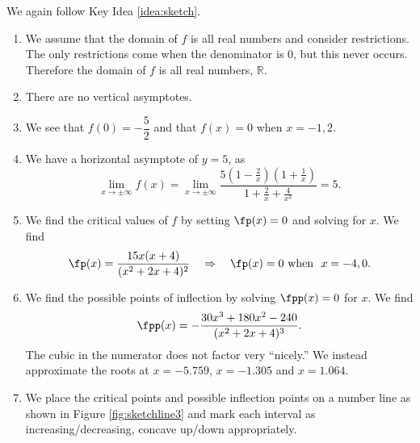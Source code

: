 
{We again follow Key Idea \ref{idea:sketch}.
	\begin{enumerate}
	\item		We assume that the domain of $f$ is all real numbers and consider restrictions. The only restrictions come when the denominator is 0, but this never occurs. Therefore the domain of $f$ is all real numbers, $\mathbb{R}$.
	\item		There are no vertical asymptotes.
	\item		We see that $f(0)=-\dfrac52$ and that $f(x)=0$ when $x=-1,2$.
	\item		We have a horizontal asymptote of $y=5$, as
	\[\lim_{x\to\pm\infty}f(x)=\lim_{x\to\pm\infty}\frac{5(1-\frac2x)(1+\frac1x)}{1+\frac2x+\frac4{x^2}}=5.\]
	\item		We find the critical values of $f$ by setting $\fp(x)=0$ and solving for $x$. We find 
				$$\fp(x) = \frac{15x(x+4)}{(x^2+2x+4)^2} \quad \Rightarrow \quad \fp(x) = 0 \text{ when } \ x=-4,0.$$
	\item		We find the possible points of inflection by solving $\fpp(x) = 0$ for $x$. We find
			$$\fpp(x) = -\frac{30x^3+180x^2-240}{(x^2+2x+4)^3}.$$ The cubic in the numerator does not factor very ``nicely.'' We instead approximate the roots at $x= -5.759$, $x=-1.305$ and $x=1.064$.
			
	\item		We place the critical points and possible inflection points on a number line as shown in Figure \ref{fig:sketchline3} and mark each interval as increasing/decreasing, concave up/down appropriately.
	

\end{enumerate}}
